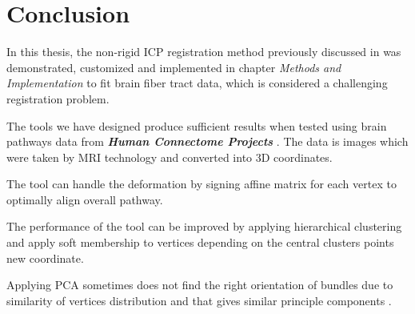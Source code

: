 \documentclass[../structure.tex]{subfiles}
\begin{document}
\chapter{Conclusion}
In this thesis, the non-rigid ICP registration method previously discussed in \cite{Amberg_2007} was demonstrated, customized and implemented in chapter \textit{Methods and Implementation} to fit brain fiber tract data, which is considered a challenging registration problem.

The tools we have designed produce sufficient results when tested using brain pathways data from \textbf{\textit{Human Connectome Projects}} \cite{CCF}. The data is images which were taken by MRI technology and converted into 3D coordinates.

The tool can handle the deformation by signing affine matrix for each vertex to optimally align overall pathway.

The performance of the tool can be improved by applying hierarchical clustering and apply soft membership to vertices depending on the central clusters points new coordinate.

Applying PCA sometimes does not find the right orientation of bundles due to similarity of vertices distribution and that gives similar principle components .
\end{document}
